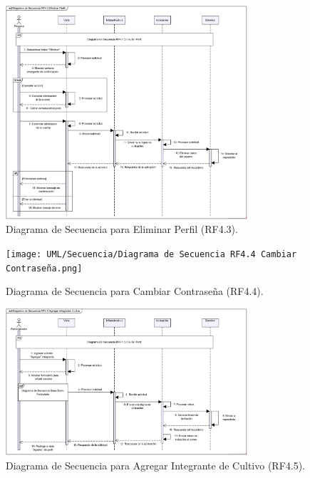 \begin{figure}[H]
	\centering
	\caption{Diagrama de Secuencia para Eliminar Perfil (RF4.3).}
 \includegraphics[width=0.8\textwidth]{UML/Secuencia/Diagrama de Secuencia RF4.3 Eliminar Perfil.png}
\end{figure}


\begin{figure}[H]
	\centering
		\caption{Diagrama de Secuencia para Cambiar Contraseña (RF4.4).}
	\texttt{[image: UML/Secuencia/Diagrama de Secuencia RF4.4 Cambiar Contraseña.png]}
\end{figure}


\begin{figure}[H]
	\centering
		\caption{Diagrama de Secuencia para Agregar Integrante de Cultivo (RF4.5).}
\includegraphics[width=0.8\textwidth]{UML/Secuencia/Diagrama de Secuencia RF4.5 Agregar Integrante Cultivo.png}
\end{figure}

